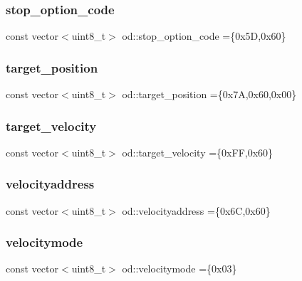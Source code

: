 \mbox{\label{namespaceod_af1bc07726906ffc6ea25ab9abb478143}} 
\subsubsection{\texorpdfstring{stop\+\_\+option\+\_\+code}{stop\_option\_code}}
{\footnotesize\ttfamily const vector$<$uint8\+\_\+t$>$ od\+::stop\+\_\+option\+\_\+code =\{0x5\+D,0x60\}}

\mbox{\label{namespaceod_a0bdcdb539c588cfae0d43cc0ba40ea05}} 
\subsubsection{\texorpdfstring{target\+\_\+position}{target\_position}}
{\footnotesize\ttfamily const vector$<$uint8\+\_\+t$>$ od\+::target\+\_\+position =\{0x7\+A,0x60,0x00\}}

\mbox{\label{namespaceod_a758ce0003cc482e5464959ed79c808e2}} 
\subsubsection{\texorpdfstring{target\+\_\+velocity}{target\_velocity}}
{\footnotesize\ttfamily const vector$<$uint8\+\_\+t$>$ od\+::target\+\_\+velocity =\{0x\+F\+F,0x60\}}

\mbox{\label{namespaceod_adf45781fb80275c184d548ea793b376b}} 
\subsubsection{\texorpdfstring{velocityaddress}{velocityaddress}}
{\footnotesize\ttfamily const vector$<$uint8\+\_\+t$>$ od\+::velocityaddress =\{0x6\+C,0x60\}}

\mbox{\label{namespaceod_a2771fb30adf397c1cd2ddb092a414e82}} 
\subsubsection{\texorpdfstring{velocitymode}{velocitymode}}
{\footnotesize\ttfamily const vector$<$uint8\+\_\+t$>$ od\+::velocitymode =\{0x03\}}

